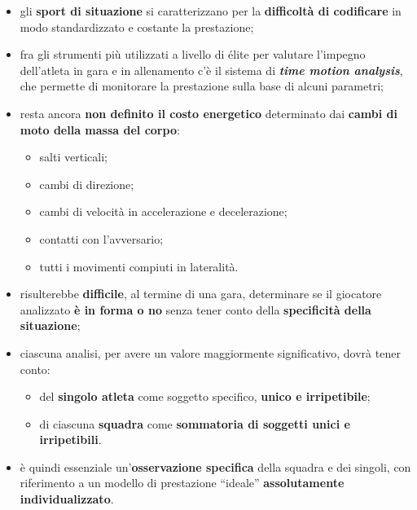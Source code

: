 \begin{itemize}
  \item gli \textbf{sport di situazione} si caratterizzano per la \textbf{difficoltà di codificare}
    in modo standardizzato e costante la prestazione;
  \item fra gli strumenti più utilizzati a livello di élite per valutare l'impegno dell'atleta in
    gara e in allenamento c'è il sistema di \textbf{\textit{time motion analysis}}, che permette di
    monitorare la prestazione sulla base di alcuni parametri;
  \item resta ancora \textbf{non definito il costo energetico} determinato dai \textbf{cambi di moto
    della massa del corpo}:
    \begin{itemize}
      \item salti verticali;
      \item cambi di direzione;
      \item cambi di velocità in accelerazione e decelerazione;
      \item contatti con l'avversario;
      \item tutti i movimenti compiuti in lateralità.
    \end{itemize}
\end{itemize}

\begin{itemize}
  \item risulterebbe \textbf{difficile}, al termine di una gara, determinare se il giocatore
    analizzato \textbf{è in forma o no} senza tener conto della \textbf{specificità della
    situazione};
  \item ciascuna analisi, per avere un valore maggiormente significativo, dovrà tener conto:
    \begin{itemize}
      \item del \textbf{singolo atleta} come soggetto specifico, \textbf{unico e irripetibile};
      \item di ciascuna \textbf{squadra} come \textbf{sommatoria di soggetti unici e irripetibili}.
    \end{itemize}
  \item è quindi essenziale un'\textbf{osservazione specifica} della squadra e dei singoli, con
    riferimento a un modello di prestazione ``ideale'' \textbf{assolutamente individualizzato}.
\end{itemize}

